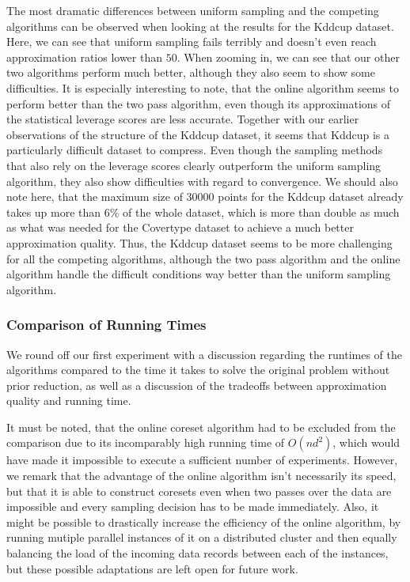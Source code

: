 The most dramatic differences between uniform sampling and the
competing algorithms can be observed when looking
at the results for the Kddcup dataset. Here, we can see that
uniform sampling fails terribly and doesn't even reach
approximation ratios lower than $50$. When zooming in, we can
see that our other two algorithms perform much better, although they
also seem to show some difficulties. It is especially interesting
to note, that the online algorithm seems to perform better than the
two pass algorithm, even though its approximations of the
statistical leverage scores are less accurate.
Together with our earlier observations of the structure of the
Kddcup dataset, it seems that Kddcup is a particularly difficult
dataset to compress. Even though the sampling methods that
also rely on the leverage scores clearly outperform the
uniform sampling algorithm, they also show difficulties with
regard to convergence. We should also note here, that the
maximum size of $30000$ points for the Kddcup dataset already
takes up more than $6\%$ of the whole dataset, which is more than
double as much as what was needed for the Covertype dataset to
achieve a much better approximation quality.
Thus, the Kddcup dataset seems to be more challenging for all the
competing algorithms, although the two pass algorithm and the
online algorithm handle the difficult conditions way better than
the uniform sampling algorithm.

\subsubsection{Comparison of Running Times}

We round off our first experiment with a discussion regarding the
runtimes of the algorithms compared to the time it takes to
solve the original problem without prior reduction, as well as
a discussion of the tradeoffs between approximation quality and
running time.

It must be noted, that the online coreset algorithm
had to be excluded from the comparison due to its
incomparably high running time of $O(nd^2)$, which would have
made it impossible to execute a sufficient number of experiments.
However, we remark that the advantage of the online algorithm isn't
necessarily its speed, but that it is able to construct coresets
even when two passes over the data are impossible and every sampling
decision has to be made immediately. Also, it might be possible
to drastically increase the efficiency of the online algorithm,
by running mutiple parallel instances of it on a distributed
cluster and then equally balancing the load of the incoming
data records between
each of the instances, but these possible adaptations are
left open for future work.

